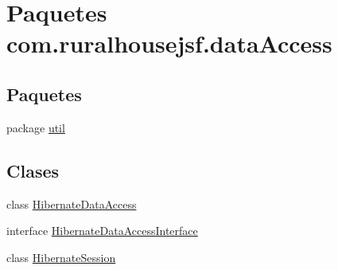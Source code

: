 \hypertarget{a00112}{}\section{Paquetes com.\+ruralhousejsf.\+data\+Access}
\label{a00112}
\subsection*{Paquetes}
\begin{DoxyCompactItemize}
\item 
package \mbox{\hyperlink{a00113}{util}}
\end{DoxyCompactItemize}
\subsection*{Clases}
\begin{DoxyCompactItemize}
\item 
class \mbox{\hyperlink{a00144}{Hibernate\+Data\+Access}}
\item 
interface \mbox{\hyperlink{a00148}{Hibernate\+Data\+Access\+Interface}}
\item 
class \mbox{\hyperlink{a00152}{Hibernate\+Session}}
\end{DoxyCompactItemize}
